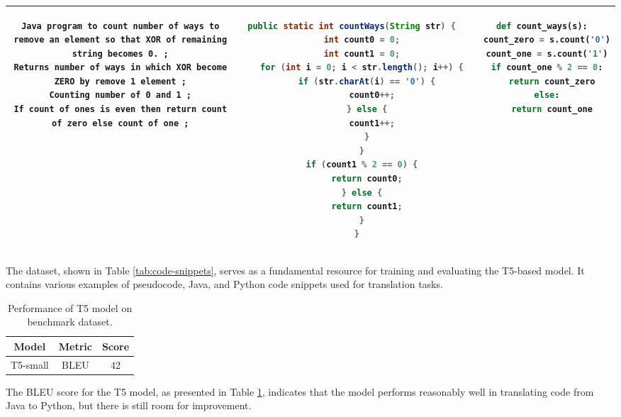 \documentclass{dhbenelux}
\begin{document}
\begin{table}[h!]
{\begin{tabular}{|c|c|c|}
\begin{minipage}[t]{0.3\textwidth}
\begin{lstlisting}[basicstyle=\ttfamily\scriptsize, breaklines=true]
Java program to count number of ways to remove an element so that XOR of remaining string becomes 0. ;
Returns number of ways in which XOR become ZERO by remove 1 element ;
Counting number of 0 and 1 ;
If count of ones is even then return count of zero else count of one ;
\end{lstlisting}
\end{minipage}
&
\begin{minipage}[t]{0.3\textwidth}
\begin{lstlisting}[language=Java, basicstyle=\ttfamily\scriptsize, breaklines=true]
public static int countWays(String str) {
    int count0 = 0;
    int count1 = 0;
    for (int i = 0; i < str.length(); i++) {
      if (str.charAt(i) == '0') {
        count0++;
      } else {
        count1++;
      }
    }
    if (count1 % 2 == 0) {
      return count0;
    } else {
      return count1;
    }
  }
\end{lstlisting}
\end{minipage}
&
\begin{minipage}[t]{0.3\textwidth}
\begin{lstlisting}[language=Python, basicstyle=\ttfamily\scriptsize, breaklines=true]
def count_ways(s):
  count_zero = s.count('0')
  count_one = s.count('1')
  if count_one % 2 == 0:
    return count_zero
  else:
    return count_one
\end{lstlisting}
\end{minipage}
\\
\hline
\end{tabular}
}
\end{table}

The dataset, shown in Table \ref{tab:code-snippets}, serves as a fundamental resource for training and evaluating the T5-based model. It contains various examples of pseudocode, Java, and Python code snippets used for translation tasks.

\begin{table}[h!]
\centering
\caption{Performance of T5 model on benchmark dataset.} %
\label{tab:bleu_results}
\begin{tabular}{|c|c|c|}
\hline
\textbf{Model} & \textbf{Metric} & \textbf{Score}\\
\hline
T5-small & BLEU & 42 \\
\hline
\end{tabular}
\end{table}

The BLEU score for the T5 model, as presented in Table \ref{tab:bleu_results}, indicates that the model performs reasonably well in translating code from Java to Python, but there is still room for improvement.
\end{document}
